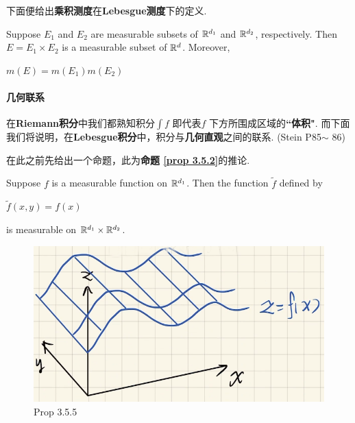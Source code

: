 	\vspace{2em}
	下面便给出\textbf{乘积测度}在\textbf{Lebesgue测度}下的定义.
	\begin{proposition}\label{prop 3.5.2}
		Suppose $E_1$ and $E_2$ are measurable subsets of $\mathbb{R}^{d_1}$ and $\mathbb{R}^{d_2}$, respectively. Then $E = E_1 \times E_2$ is a measurable subset of $\mathbb{R}^d$. Moreover,
		\begin{center}
			$m(E) = m(E_1) m(E_2)$
		\end{center}
	\end{proposition}

\newpage
\paragraph{几何联系}
	在\textbf{Riemann积分}中我们都熟知积分$\int{f}$ 即代表$f$ 下方所围成区域的\textbf{``体积"}. 而下面我们将说明，在\textbf{Lebesgue积分}中，积分与\textbf{几何直观}之间的联系.  (Stein P85$\sim$ 86)
	
	\vspace{1em}
	在此之前先给出一个命题，此为\textbf{命题 \ref{prop 3.5.2}}的推论.
	\begin{corollary}\label{cor 3.5.5}
		Suppose $f$ is a measurable function on $\mathbb{R}^{d_1}$. Then the function $\widetilde{f}$ defined by
		\begin{center}
			$\widetilde{f}(x , y) = f(x)$
		\end{center}
		is measurable on $\mathbb{R}^{d_1} \times \mathbb{R}^{d_2}$.
		
		\begin{figure}[thbp!]
			\centering
			\includegraphics[width=0.3\linewidth]{figure/3.5.2-1}
			\caption{Prop 3.5.5}
			\label{pic : 3.5.2-1} %
		\end{figure}
	\end{corollary}

